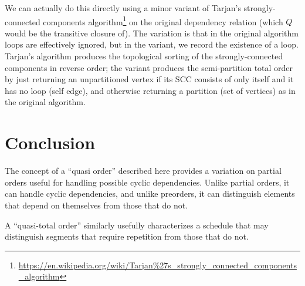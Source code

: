 \documentclass[12pt]{article}
\theoremstyle{definition}
\theoremstyle{theorem}
\begin{document}
We can actually do this directly using a minor variant of Tarjan's
strongly-connected components algorithm\footnote{%
\url{https://en.wikipedia.org/wiki/Tarjan\%27s_strongly_connected_components_algorithm}
}
on the original
dependency relation (which $Q$ would be the transitive closure of).
The variation is that in the original algorithm loops are effectively
ignored, but in the variant, we record the existence of a loop.
Tarjan's algorithm produces the topological sorting of
the strongly-connected components in reverse order; the variant
produces the semi-partition total order by just returning an
unpartitioned vertex if its SCC consists of only itself and it has no
loop (self edge), and otherwise returning a partition (set of
vertices) as in the original algorithm.

\section{Conclusion}

The concept of a ``quasi order'' described here provides a variation
on partial orders useful for handling possible cyclic dependencies.
Unlike partial orders, it can handle cyclic dependencies, and unlike
preorders, it can distinguish elements that depend on themselves from
those that do not.

A ``quasi-total order'' similarly usefully characterizes a schedule
that may distinguish segments that require repetition from those that do
not.
\end{document}
